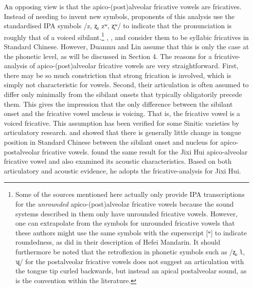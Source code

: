 \documentclass[output=paper,colorlinks,citecolor=brown,chinesefont]{langscibook}
\begin{document}
An opposing view is that the apico-(post)alveolar fricative vowels are fricatives. Instead of needing to invent new symbols, proponents of this analysis use the standardised IPA symbols /z, ʐ, zʷ, ʐʷ/ to indicate that the pronunciation is roughly that of a voiced sibilant.\footnote{Some of the sources mentioned here actually only provide IPA transcriptions for the \textit{unrounded} apico-(post)alveolar fricative vowels because the sound systems described in them only have unrounded fricative vowels. However, one can extrapolate from the symbols for unrounded fricative vowels that these authors might use the same symbols with the superscript [ʷ] to indicate roundedness, as \citet{Kong_et_al_2022} did in their description of Hefei Mandarin. It should furthermore be noted that the retroflexion in phonetic symbols such as /ʐ, ʅ, ʯ/ for the postalveolar fricative vowels does not suggest an articulation with the tongue tip curled backwards, but instead an apical postalveolar sound, as is the convention within the literature.} \citet{Duanmu_2007}, \citet{Lin_2007}, and \citet{Wiedenhof_2015} consider them to be syllabic fricatives in Standard Chinese. However, Duanmu and Lin assume that this is only the case at the phonetic level, as will be discussed in Section 4. The reasons for a fricative-analysis of apico-(post)alveolar fricative vowels are very straightforward. First, there may be so much constriction that strong frication is involved, which is simply not characteristic for vowels. Second, their articulation is often assumed to differ only minimally from the sibilant onsets that typically obligatorily precede them. This gives the impression that the only difference between the sibilant onset and the fricative vowel nucleus is voicing. That is, the fricative vowel is a voiced fricative. This assumption has been verified for some Sinitic varieties by articulatory research. \citet{Lee-Kim_2014} and \citet{faytak&lin_2015} showed that there is generally little change in tongue position in Standard Chinese between the sibilant onset and nucleus for apico-postalveolar fricative vowels. \citet{shao_2020} found the same result for the Jixi Hui apico-alveolar fricative vowel and also examined its acoustic characteristics. Based on both articulatory and acoustic evidence, he adopts the fricative-analysis for Jixi Hui.
\end{document}
